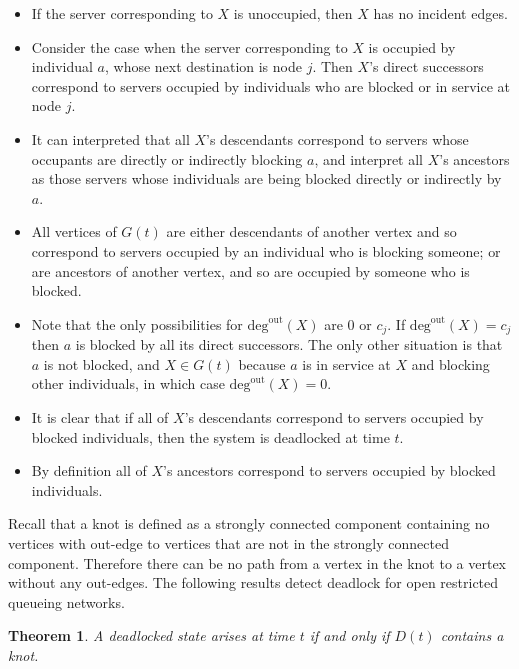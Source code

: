 \documentclass{article}
\newtheorem{theorem}{Theorem}
\numberwithin{equation}{section}
\begin{document}
\begin{itemize}

  \item If the server corresponding to $X$ is unoccupied, then $X$ has no incident edges.
  \item Consider the case when the server corresponding to $X$ is occupied by individual $a$, whose next destination is node $j$. Then $X$'s direct successors correspond to servers occupied by individuals who are blocked or in service at node $j$.
  \item It can interpreted that all $X$'s descendants correspond to servers whose occupants are directly or indirectly blocking $a$, and interpret all $X$'s ancestors as those servers whose individuals are being blocked directly or indirectly by $a$.
  \item All vertices of $G(t)$ are either descendants of another vertex and so correspond to servers occupied by an individual who is blocking someone; or are ancestors of another vertex, and so are occupied by someone who is blocked.
  \item Note that the only possibilities for $\text{deg}^{\text{out}}(X)$ are 0 or $c_j$. If $\text{deg}^{\text{out}}(X) = c_j$ then $a$ is blocked by all its direct successors. The only other situation is that $a$ is not blocked, and $X \in G(t)$ because $a$ is in service at $X$ and blocking other individuals, in which case $\text{deg}^{\text{out}}(X) = 0$.
  \item It is clear that if all of $X$'s descendants correspond to servers occupied by blocked individuals, then the system is deadlocked at time $t$.
  \item By definition all of $X$'s ancestors correspond to servers occupied by blocked individuals.

\end{itemize}

Recall that a knot is defined as a strongly connected component containing no vertices with out-edge to vertices that are not in the strongly connected component.
Therefore there can be no path from a vertex in the knot to a vertex without any out-edges.
The following results detect deadlock for open restricted queueing networks.


\begin{theorem}\label{thrm:knot}
A deadlocked state arises at time $t$ if and only if $D(t)$ contains a knot.
\end{theorem}
\end{document}
